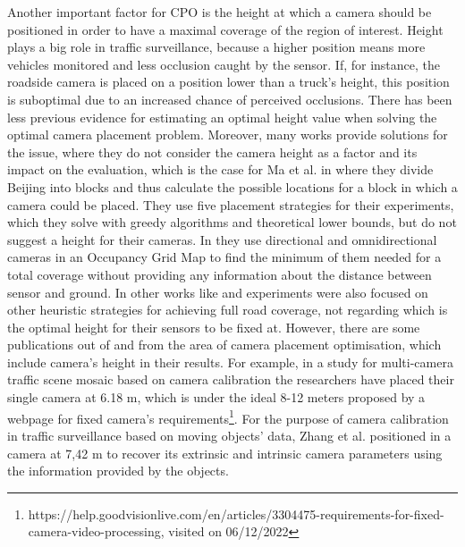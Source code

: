 Another important factor for CPO is the height at which a camera should be positioned in order to have a maximal coverage of the region of interest. Height plays a big role in traffic surveillance, because a higher position means more vehicles monitored and less occlusion caught by the sensor. If, for instance, the roadside camera is placed on a position lower than a truck's height, this position is suboptimal due to an increased chance of perceived occlusions. There has been less previous evidence for estimating an optimal height value when solving the optimal camera placement problem. Moreover, many works provide solutions for the issue, where they do not consider the camera height as a factor and its impact on the evaluation, which is the case for Ma et al. in \cite{surveillance_related_work} where they divide Beijing into blocks and thus calculate the possible locations for a block in which a camera could be placed. They use five placement strategies for their experiments, which they solve with greedy algorithms and theoretical lower bounds, but do not suggest a height for their cameras. In \cite{total_coverage_optimum} they use directional and omnidirectional cameras in an Occupancy Grid Map to find the minimum of them needed for a total coverage without providing any information about the distance between sensor and ground. In other works like \cite{max_camera_coverage} and \cite{genetic_alg} experiments were also focused on other heuristic strategies for achieving full road coverage, not regarding which is the optimal height for their sensors to be fixed at. However, there are some publications out of and from the area of camera placement optimisation, which include camera's height in their results. For example, in a study for multi-camera traffic scene mosaic based on camera calibration \cite{multi_camera_calib} the researchers have placed their single camera at 6.18 m, which is under the ideal 8-12 meters proposed by a webpage for fixed camera's requirements\footnote{https://help.goodvisionlive.com/en/articles/3304475-requirements-for-fixed-camera-video-processing, visited on 06/12/2022}. For the purpose of camera calibration in traffic surveillance based on moving objects' data, Zhang et al. positioned in \cite{practical_camera_calib} a camera at 7,42 m to recover its extrinsic and intrinsic camera parameters using the information provided by the objects.  

